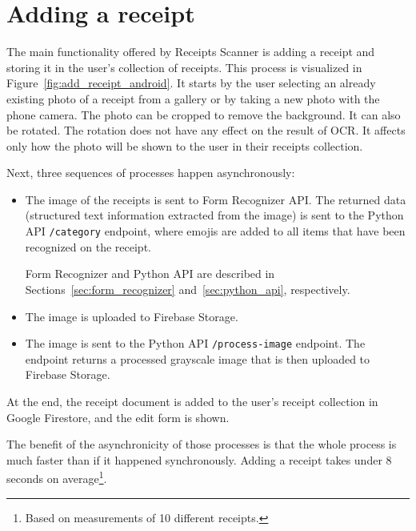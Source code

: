 \documentclass[
  digital, %
  table,   %
  oneside, %
  lof,     %
  lot,     %
]{fithesis3}
\begin{document}
\section{Adding a receipt}
The main functionality offered by Receipts Scanner is adding a receipt and storing it in the user's collection of receipts.
This process is visualized in Figure~\ref{fig:add_receipt_android}.
It starts by the user selecting an already existing photo of a receipt from a gallery or by taking a new photo with the phone camera. The photo can be cropped to remove the background. It can also be rotated. The rotation does not have any effect on the result of OCR. It affects only how the photo will be shown to the user in their receipts collection.

Next, three sequences of processes happen asynchronously:

\begin{itemize}
    \item The image of the receipts is sent to Form Recognizer API. The returned data (structured text information extracted from the image) is sent to the Python API \texttt{/category} endpoint, where emojis are added to all items that have been recognized on the receipt.
    
    Form Recognizer and Python API are described in Sections~\ref{sec:form_recognizer} and~\ref{sec:python_api}, respectively.
    
    \item The image is uploaded to Firebase Storage.

    \item The image is sent to the Python API \texttt{/process-image} endpoint. The endpoint returns a processed grayscale image that is then uploaded to Firebase Storage.
\end{itemize}

At the end, the receipt document is added to the user's receipt collection in Google Firestore, and the edit form is shown. 

The benefit of the asynchronicity of those processes is that the whole process is much faster than if it happened synchronously. Adding a receipt takes under 8 seconds on average\footnote{Based on measurements of 10 different receipts.}.
\end{document}
